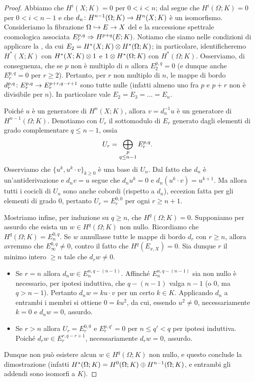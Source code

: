 \begin{proof}
Abbiamo che $H^i(X;K)=0$ per $0<i<n$; dal  segue che $H^i(\Omega;K)=0$ per $0<i<n-1$ e che $d_n\colon H^{n-1}(\Omega;K)\to H^n(X;K)$ è un isomorfismo. Consideriamo la fibrazione $\Omega\hookrightarrow E\to X$ del  e la successione spettrale coomologica associata $E^{p,q}_r\Rightarrow H^{p+q}(E;K)$. Notiamo che siamo nelle condizioni di applicare la , da cui $E_2=H^*(X;K)\mathbin{\otimes} H^*(\Omega;K)$; in particolare, identificheremo $H^*(X;K)$ con $H^*(X;K)\mathbin{\otimes} 1$ e $1\mathbin{\otimes} H^*(\Omega;K)$ con $H^*(\Omega;K)$. Osserviamo, di conseguenza, che se $p$ non è multiplo di $n$ allora $E^{p,q}_2=0$ (e dunque anche $E^{p,q}_r=0$ per $r\ge2$). Pertanto, per $r$ non multiplo di $n$, le mappe di bordo $d^{p,q}_r\colon E^{p,q}_r\to E^{p+r,q-r+1}_r$ sono tutte nulle (infatti almeno uno fra $p$ e $p+r$ non è divisibile per $n$). In particolare vale $E_2=E_3=\ldots=E_n$.

Poiché $u$ è un generatore di $H^n(X;K)$, allora $v=d_n^{-1}u$ è un generatore di $H^{n-1}(\Omega;K)$. Denotiamo con $U_r$ il sottomodulo di $E_r$ generato dagli elementi di grado complementare $q\le n-1$, ossia
$$
U_r=\bigoplus_{\substack{p\\q\le n-1}}E^{p,q}_r.
$$
Osserviamo che $\{u^k,u^k\cdot v\}_{k\ge 0}$ è una base di $U_n$. Dal fatto che $d_n$ è un'antiderivazione e $d_nv=u$ segue che $d_n u^k=0$ e $d_n(u^k\cdot v)=u^{k+1}$. Ma allora tutti i cocicli di $U_n$ sono anche cobordi (rispetto a $d_n$), eccezion fatta per gli elementi di grado $0$, pertanto $U_r=E^{0,0}_r$ per ogni $r\ge n+1$.

Mostriamo infine, per induzione su $q\ge n$, che $H^q(\Omega;K)=0$. Supponiamo per assurdo che esista un $w\in H^q(\Omega;K)$ non nullo. Ricordiamo che $H^q(\Omega;K)=E^{0,q}_n$. Se $w$ annullasse tutte le mappe di bordo $d_r$ con $r\ge n$, allora avremmo che $E^{0,q}_\infty\neq 0$, contro il fatto che $H^q(E_{x,X})=0$. Sia dunque $r$ il minimo intero $\ge n$ tale che $d_rw\neq 0$.
\begin{itemize}
\item Se $r=n$ allora $d_nw\in E^{n,q-(n-1)}_n$. Affinché $E^{n,q-(n-1)}_n$ sia non nullo è necessario, per ipotesi induttiva, che $q-(n-1)$ valga $n-1$ (o $0$, ma $q>n-1$). Pertanto $d_nw=ku\cdot v$ per un certo $k\in K$. Applicando $d_n$ a entrambi i membri si ottiene $0=ku^2$, da cui, essendo $u^2\neq 0$, necessariamente $k=0$ e $d_nw=0$, assurdo.
\item Se $r>n$ allora $U_r=E^{0,0}_r$ e $E^{p,q'}_r=0$ per $n\le q'<q$ per ipotesi induttiva. Poiché $d_rw\in E^{r,q-r+1}_r$, necessariamente $d_rw=0$, assurdo.
\end{itemize}
Dunque non può esistere alcun $w\in H^q(\Omega;K)$ non nullo, e questo conclude la dimostrazione (infatti $H^*(\Omega;K)=H^0(\Omega;K)\mathbin{\oplus} H^{n-1}(\Omega;K)$, e entrambi gli addendi sono isomorfi a $K$).
\end{proof}

